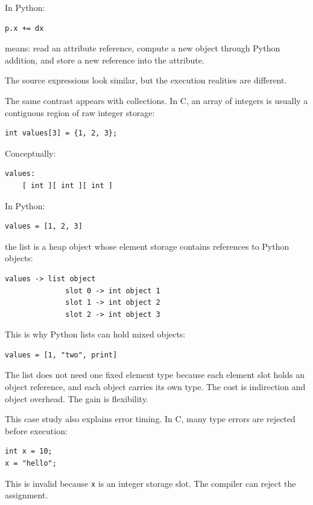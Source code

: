 In Python:

\begin{verbatim}
p.x += dx
\end{verbatim}

means: read an attribute reference, compute a new object through Python addition, and store a new reference into the attribute.

The source expressions look similar, but the execution realities are different.

The same contrast appears with collections. In C, an array of integers is usually a contiguous region of raw integer storage:

\begin{verbatim}
int values[3] = {1, 2, 3};
\end{verbatim}

Conceptually:

\begin{verbatim}
values:
    [ int ][ int ][ int ]
\end{verbatim}

In Python:

\begin{verbatim}
values = [1, 2, 3]
\end{verbatim}

the list is a heap object whose element storage contains references to Python objects:

\begin{verbatim}
values -> list object
              slot 0 -> int object 1
              slot 1 -> int object 2
              slot 2 -> int object 3
\end{verbatim}

This is why Python lists can hold mixed objects:

\begin{verbatim}
values = [1, "two", print]
\end{verbatim}

The list does not need one fixed element type because each element slot holds an object reference, and each object carries its own type. The cost is indirection and object overhead. The gain is flexibility.

This case study also explains error timing. In C, many type errors are rejected before execution:

\begin{verbatim}
int x = 10;
x = "hello";
\end{verbatim}

This is invalid because \texttt{x} is an integer storage slot. The compiler can reject the assignment.

